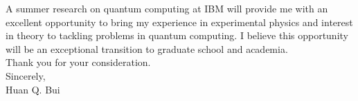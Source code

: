 \documentclass[10pt]{article}
\begin{document}
  
\noindent A summer research on quantum computing at IBM will provide me with an excellent opportunity to bring my experience in experimental physics and interest in theory to tackling problems in quantum computing.  I believe this opportunity will be an exceptional transition to graduate school and academia.\\

\noindent Thank you for your consideration. \\

\noindent Sincerely,\\

$\,$\\
$\,$\\


\noindent Huan Q. Bui



% 
%
















	
	
	
	
	
\end{document}
